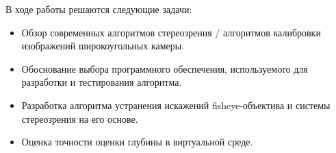 В ходе работы решаются следующие задачи:
\begin{itemize}     %
    \item Обзор современных алгоритмов стереозрения / алгоритмов калибровки изображений широкоугольных камеры.
    \item Обоснование выбора программного обеспечения, используемого для разработки и тестирования алгоритма. 
    \item Разработка алгоритма устранения искажений fisheye-объектива и системы стереозрения на его основе.                                     %
    \item Оценка точности оценки глубины в виртуальной среде.  
\end{itemize}


\clearpage